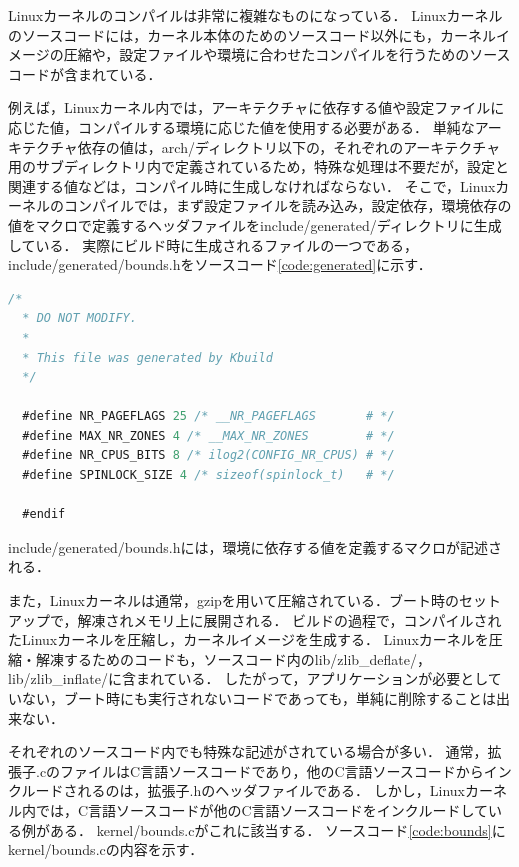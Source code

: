 \documentclass[graduation-thesis]{mlarticle}
\begin{document}
Linuxカーネルのコンパイルは非常に複雑なものになっている．
Linuxカーネルのソースコードには，カーネル本体のためのソースコード以外にも，カーネルイメージの圧縮や，設定ファイルや環境に合わせたコンパイルを行うためのソースコードが含まれている．

例えば，Linuxカーネル内では，アーキテクチャに依存する値や設定ファイルに応じた値，コンパイルする環境に応じた値を使用する必要がある．
単純なアーキテクチャ依存の値は，arch/ディレクトリ以下の，それぞれのアーキテクチャ用のサブディレクトリ内で定義されているため，特殊な処理は不要だが，設定と関連する値などは，コンパイル時に生成しなければならない．
そこで，Linuxカーネルのコンパイルでは，まず設定ファイルを読み込み，設定依存，環境依存の値をマクロで定義するヘッダファイルをinclude/generated/ディレクトリに生成している．
実際にビルド時に生成されるファイルの一つである，include/generated/bounds.hをソースコード\ref{code:generated}に示す．

\begin{lstlisting}[language=C, caption=include/generated/bounds.h, label=code:generated]
  /*
  * DO NOT MODIFY.
  *
  * This file was generated by Kbuild
  */

  #define NR_PAGEFLAGS 25 /* __NR_PAGEFLAGS       # */
  #define MAX_NR_ZONES 4 /* __MAX_NR_ZONES        # */
  #define NR_CPUS_BITS 8 /* ilog2(CONFIG_NR_CPUS) # */
  #define SPINLOCK_SIZE 4 /* sizeof(spinlock_t)   # */

  #endif
\end{lstlisting}

include/generated/bounds.hには，環境に依存する値を定義するマクロが記述される．



また，Linuxカーネルは通常，gzipを用いて圧縮されている．ブート時のセットアップで，解凍されメモリ上に展開される．
ビルドの過程で，コンパイルされたLinuxカーネルを圧縮し，カーネルイメージを生成する．
Linuxカーネルを圧縮・解凍するためのコードも，ソースコード内のlib/zlib\_deflate/，lib/zlib\_inflate/に含まれている．
したがって，アプリケーションが必要としていない，ブート時にも実行されないコードであっても，単純に削除することは出来ない．


それぞれのソースコード内でも特殊な記述がされている場合が多い．
通常，拡張子.cのファイルはC言語ソースコードであり，他のC言語ソースコードからインクルードされるのは，拡張子.hのヘッダファイルである．
しかし，Linuxカーネル内では，C言語ソースコードが他のC言語ソースコードをインクルードしている例がある．
kernel/bounds.cがこれに該当する．
ソースコード\ref{code:bounds}にkernel/bounds.cの内容を示す．
\end{document}
